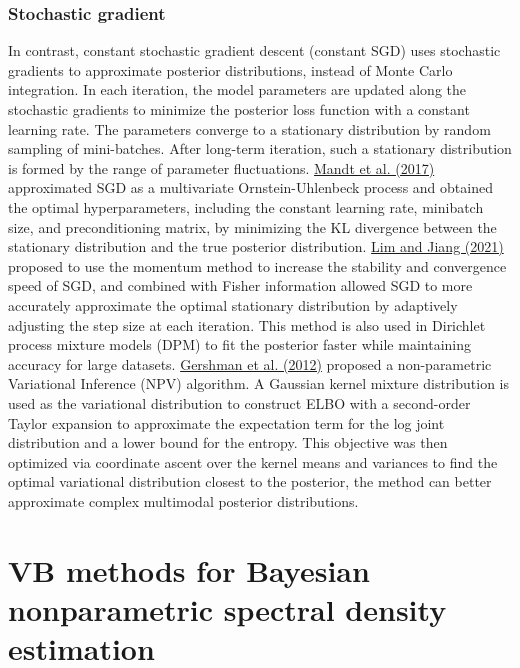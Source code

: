 \documentclass[12pt,a4paper]{article}
\begin{document}
\subsubsection{Stochastic gradient}
In contrast, constant stochastic gradient descent (constant SGD) uses stochastic gradients to approximate posterior distributions, instead of Monte Carlo integration. In each iteration, the model parameters are updated along the stochastic gradients to minimize the posterior loss function with a constant learning rate. The parameters converge to a stationary distribution by random sampling of mini-batches. After long-term iteration, such a stationary distribution is formed by the range of parameter fluctuations. \hyperref[mandt2017]{Mandt et al. (2017)} approximated SGD as a multivariate Ornstein-Uhlenbeck process and obtained the optimal hyperparameters, including the constant learning rate, minibatch size, and preconditioning matrix, by minimizing the KL divergence between the stationary distribution and the true posterior distribution. \hyperref[lim2021]{Lim and Jiang (2021)} proposed to use the momentum method to increase the stability and convergence speed of SGD, and combined with Fisher information allowed SGD to more accurately approximate the optimal stationary distribution by adaptively adjusting the step size at each iteration. This method is also used in Dirichlet process mixture models (DPM) to fit the posterior faster while maintaining accuracy for large datasets. \hyperref[gershman2012]{Gershman et al. (2012)} proposed a non-parametric Variational Inference (NPV) algorithm. A Gaussian kernel mixture distribution is used as the variational distribution to construct ELBO with a second-order Taylor expansion to approximate the expectation term for the log joint distribution and a lower bound for the entropy. This objective was then optimized via coordinate ascent over the kernel means and variances to find the optimal variational distribution closest to the posterior, the method can better approximate complex multimodal posterior distributions.










\section{VB methods for Bayesian nonparametric spectral density estimation}
\label{sec:fbi}
\end{document}
